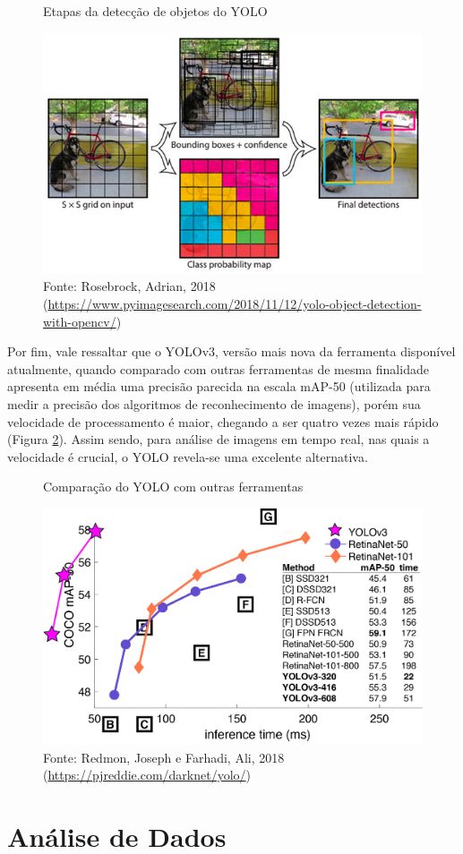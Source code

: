 \begin{figure}[H]
    \centering
    \caption{Etapas da detecção de objetos do YOLO}
    \includegraphics[width=0.6\linewidth]{Imagens/yolo-design.jpg}
    \caption*{Fonte: Rosebrock, Adrian, 2018 (\url{https://www.pyimagesearch.com/2018/11/12/yolo-object-detection-with-opencv/})}
    \label{funcyolo}
\end{figure}

\par Por fim, vale ressaltar que o YOLOv3, versão mais nova da ferramenta disponível atualmente, quando comparado com outras ferramentas de mesma finalidade apresenta em média uma precisão parecida na escala mAP-50 (utilizada para medir a precisão dos algoritmos de reconhecimento de imagens), porém sua velocidade de processamento é maior, chegando a ser quatro vezes mais rápido (Figura \ref{speedyolo}). Assim sendo, para análise de imagens em tempo real, nas quais a velocidade é crucial, o YOLO revela-se uma excelente alternativa.

\begin{figure}[H]
    \centering
    \caption{Comparação do YOLO com outras ferramentas}
    \includegraphics[width=0.6\linewidth]{Imagens/yolo-speed.jpg}
    \caption*{Fonte: Redmon, Joseph e Farhadi, Ali, 2018 (\url{https://pjreddie.com/darknet/yolo/})}
    \label{speedyolo}
\end{figure}

\section{Análise de Dados}

